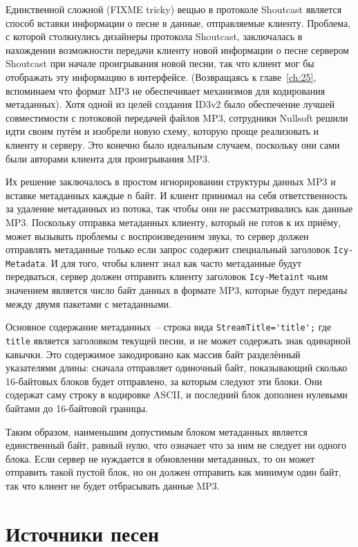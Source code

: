 Единственной сложной (FIXME tricky) вещью в протоколе Shoutcast является способ вставки
информации о песне в данные, отправляемые клиенту.  Проблема, с которой столкнулись
дизайнеры протокола Shoutcast, заключалась в нахождении возможности передачи клиенту новой
информации о песне сервером Shoutcast при начале проигрывания новой песни, так что клиент
мог бы отображать эту информацию в интерфейсе. (Возвращаясь к главе~\ref{ch:25},
вспоминаем что формат MP3 не обеспечивает механизмов для кодирования метаданных).  Хотя
одной из целей создания ID3v2 было обеспечение лучшей совместимости с потоковой передачей
файлов MP3, сотрудники Nullsoft решили идти своим путём и изобрели новую схему, которую
проще реализовать и клиенту и серверу.  Это конечно было идеальным случаем, поскольку они
сами были авторами клиента для проигрывания MP3.

Их решение заключалось в простом игнорировании структуры данных MP3 и вставке метаданных
каждые \lstinline{n} байт.  И клиент принимал на себя ответственность за удаление метаданных из
потока, так чтобы они не рассматривались как данные MP3.  Поскольку отправка метаданных
клиенту, который не готов к их приёму, может вызывать проблемы с воспроизведением звука,
то сервер должен отправлять метаданные только если запрос содержит специальный заголовок
\lstinline{Icy-Metadata}.  И для того, чтобы клиент знал как часто метаданные будут
передваться, сервер должен отправить клиенту заголовок \lstinline{Icy-Metaint} чьим значением
является число байт данных в формате MP3, которые будут переданы между двумя пакетами с
метаданными.

Основное содержание метаданных~-- строка вида \lstinline{StreamTitle='title';} где \lstinline{title}
является заголовком текущей песни, и не может содержать знак одинарной кавычки.  Это
содержимое закодировано как массив байт разделённый указателями длины: сначала отправляет
одиночный байт, показывающий сколько 16-байтовых блоков будет отправлено, за которым
следуют эти блоки.  Они содержат саму строку в кодировке ASCII, и последний блок дополнен
нулевыми байтами до 16-байтовой границы.

Таким образом, наименьшим допустимым блоком метаданных является единственный байт, равный
нулю, что означает что за ним не следует ни одного блока.  Если сервер не нуждается в
обновлении метаданных, то он может отправить такой пустой блок, но он должен отправить как
минимум один байт, так что клиент не будет отбрасывать данные MP3.

\section{Источники песен}

